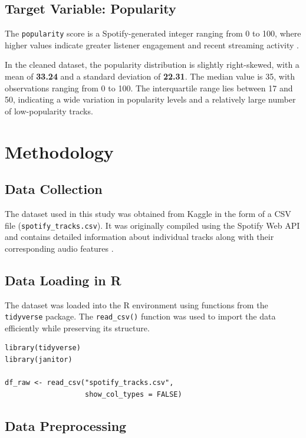 \documentclass[12pt,a4paper]{article}
\begin{document}
\subsection{Target Variable: Popularity}

The \texttt{popularity} score is a Spotify-generated integer ranging from
0 to 100, where higher values indicate greater listener engagement and
recent streaming activity \citep{spotifyapi2023}. 

In the cleaned dataset, the popularity distribution is slightly
right-skewed, with a mean of \textbf{33.24} and a standard deviation of
\textbf{22.31}. The median value is 35, with observations ranging from 0
to 100. The interquartile range lies between 17 and 50, indicating a wide
variation in popularity levels and a relatively large number of
low-popularity tracks.
\section{Methodology}

\subsection{Data Collection}

The dataset used in this study was obtained from Kaggle in the form of a
CSV file (\texttt{spotify\_tracks.csv}). It was originally compiled using
the Spotify Web API and contains detailed information about individual
tracks along with their corresponding audio features \citep{kaggle_spotify}.

\subsection{Data Loading in R}
The dataset was loaded into the R environment using functions from the
\texttt{tidyverse} package. The \texttt{read\_csv()} function was used to
import the data efficiently while preserving its structure.

\begin{verbatim}
library(tidyverse)
library(janitor)

df_raw <- read_csv("spotify_tracks.csv",
                   show_col_types = FALSE)
\end{verbatim}

\subsection{Data Preprocessing}
\label{sec:preprocessing}
\end{document}
